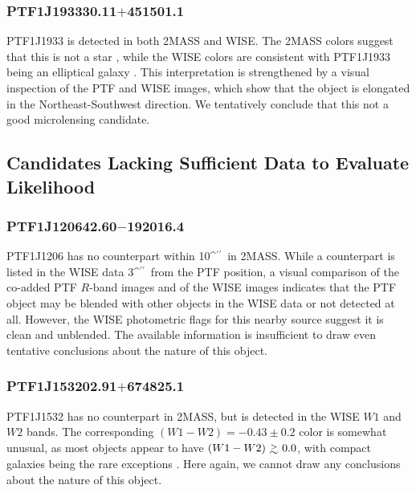 \documentclass{emulateapj}
\newcommand{\gapprox }{{\lower0.8ex\hbox{$\buildrel >\over\sim$}}}
\def\asec{\ifmmode^{\prime\prime}\else$^{\prime\prime}$\fi}
\begin{document}

\subsubsection*{PTF1J193330.11$+$451501.1} %
PTF1J1933 is detected in both 2MASS and WISE. The 2MASS colors suggest that this is not a star \citep{kev07}, while the WISE colors are consistent with PTF1J1933 being an elliptical galaxy \citep[cf.\ Figure 14 in][]{yan2013}. This interpretation is strengthened by a visual inspection of the PTF and WISE images, which show that the object is elongated in the Northeast-Southwest direction. We tentatively conclude that this not a good microlensing candidate. 

\subsection{Candidates Lacking Sufficient Data to Evaluate Likelihood}
\subsubsection*{PTF1J120642.60$-$192016.4} %
PTF1J1206 has no counterpart within 10\asec\ in 2MASS. While a counterpart is listed in the WISE data 3\asec\ from the PTF position, a visual comparison of the co-added PTF $R$-band images and of the WISE images indicates that the PTF object may be blended with other objects in the WISE data or not detected at all. However, the WISE photometric flags for this nearby source suggest it is clean and unblended. The available information is insufficient to draw even tentative conclusions about the nature of this object.

\subsubsection*{PTF1J153202.91$+$674825.1} %
PTF1J1532 has no counterpart in 2MASS, but is detected in the WISE $W1$ and $W2$ bands. The corresponding $(W1-W2) = -0.43\pm0.2$ color is somewhat unusual, as most objects appear to have $(W1-W2)\ \gapprox\ 0.0$, with compact galaxies being the rare exceptions \citep[cf.\ Figure 14 in][]{yan2013}. Here again, we cannot draw any conclusions about the nature of this object. 
\end{document}
